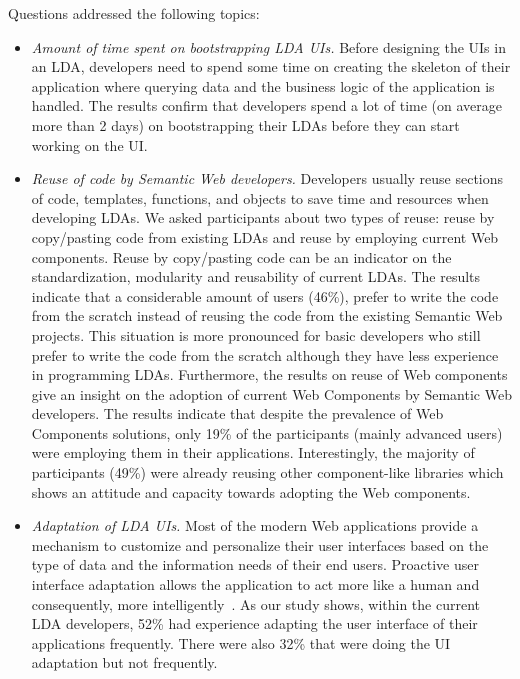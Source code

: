\documentclass{acm_proc_article-sp}
\begin{document}
Questions addressed the following topics:
\begin{itemize}

\item
\emph{Amount of time spent on bootstrapping LDA UIs.}
Before designing the UIs in an LDA, developers need to spend some time on creating the skeleton of their application where querying data and the business logic of the application is handled.
The results confirm that developers spend a lot of time (on average more than 2 days) on bootstrapping their LDAs before they can start working on the UI.
 
\item
\emph{Reuse of code by Semantic Web developers.}
Developers usually reuse sections of code, templates, functions, and objects to save time and resources when developing LDAs.
We asked participants about two types of reuse: reuse by copy/pasting code from existing LDAs and reuse by employing current Web components.
Reuse by copy/pasting code can be an indicator on the standardization, modularity and reusability of current LDAs.
The results indicate that a considerable amount of users (46\%), prefer to write the code from the scratch instead of reusing the code from the existing Semantic Web projects.
This situation is more pronounced for basic developers who still prefer to write the code from the scratch although they have less experience in programming LDAs.
Furthermore, the results on reuse of Web components give an insight on the adoption of current Web Components by Semantic Web developers.
The results indicate that despite the prevalence of Web Components solutions, only 19\% of the participants (mainly advanced users) were employing them in their applications.
Interestingly, the majority of participants (49\%) were already reusing other component-like libraries which shows an attitude and capacity towards adopting the Web components.

\item
\emph{Adaptation of LDA UIs.}
Most of the modern Web applications provide a mechanism to customize and personalize their user interfaces based on the type of data and the information needs of their end users.
Proactive user interface adaptation allows the application to act more like a human and consequently, more intelligently~\cite{adaptiveSW2011}. 
As our study shows, within the current LDA developers, 52\% had experience adapting the user interface of their applications frequently. There were also 32\% that were doing the UI adaptation but not frequently.


\end{itemize}
\end{document}
